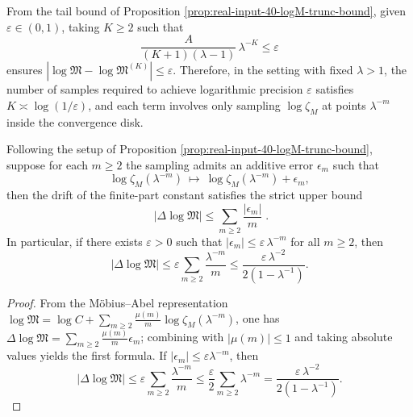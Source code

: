 \begin{remark}\label{rem:real-input-40-logM-logeps-truncation}
From the tail bound of Proposition \ref{prop:real-input-40-logM-trunc-bound}, given \(\varepsilon\in(0,1)\), taking \(K\ge 2\) such that
\[
\frac{A}{(K+1)(\lambda-1)}\,\lambda^{-K}\le \varepsilon
\]
ensures \(|\log\mathfrak{M}-\log\mathfrak{M}^{(K)}|\le \varepsilon\).
Therefore, in the setting with fixed \(\lambda>1\), the number of samples required to achieve logarithmic precision \(\varepsilon\) satisfies \(K\asymp \log(1/\varepsilon)\), and each term involves only sampling \(\log\zeta_M\) at points \(\lambda^{-m}\) inside the convergence disk.
\end{remark}

\begin{proposition}\label{prop:real-input-40-logM-stability-functional}
Following the setup of Proposition \ref{prop:real-input-40-logM-trunc-bound}, suppose for each \(m\ge 2\) the sampling admits an additive error \(\epsilon_m\) such that
\[
\log\zeta_M(\lambda^{-m})\ \longmapsto\ \log\zeta_M(\lambda^{-m})+\epsilon_m,
\]
then the drift of the finite-part constant satisfies the strict upper bound
\[
\boxed{\;
|\Delta\log\mathfrak{M}|\le \sum_{m\ge 2}\frac{|\epsilon_m|}{m}\; }.
\]
In particular, if there exists \(\varepsilon>0\) such that \(|\epsilon_m|\le \varepsilon\,\lambda^{-m}\) for all \(m\ge 2\), then
\[
|\Delta\log\mathfrak{M}|
\le
\varepsilon\sum_{m\ge 2}\frac{\lambda^{-m}}{m}
\le
\frac{\varepsilon\,\lambda^{-2}}{2(1-\lambda^{-1})}.
\]
\end{proposition}
\begin{proof}
From the M\"obius--Abel representation \(\log\mathfrak{M}=\log C+\sum_{m\ge 2}\frac{\mu(m)}{m}\log\zeta_M(\lambda^{-m})\), one has
\(
\Delta\log\mathfrak{M}=\sum_{m\ge 2}\frac{\mu(m)}{m}\epsilon_m
\);
combining with \(|\mu(m)|\le 1\) and taking absolute values yields the first formula.
If \(|\epsilon_m|\le \varepsilon\lambda^{-m}\), then
\[
|\Delta\log\mathfrak{M}|
\le \varepsilon\sum_{m\ge 2}\frac{\lambda^{-m}}{m}
\le \frac{\varepsilon}{2}\sum_{m\ge 2}\lambda^{-m}
=\frac{\varepsilon\,\lambda^{-2}}{2(1-\lambda^{-1})}.
\]
\end{proof}

